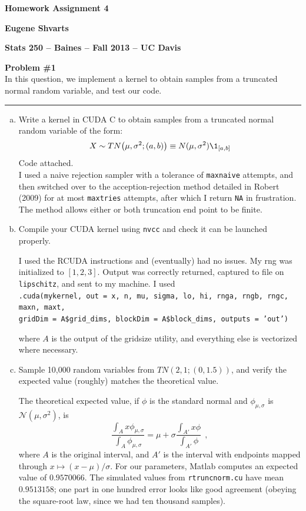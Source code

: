 \documentclass[12pt,letterpaper]{article}
\begin{document}
\hfill\textbf{\large Homework Assignment 4}

\hfill\textbf{Eugene Shvarts}

\hfill\textbf{ Stats 250 -- Baines -- Fall 2013 -- UC Davis}
\bigskip

\textbf{Problem \#1} \\ In this question, we implement a kernel to obtain samples from a truncated normal random variable, and test our code. \hrule \smallskip
\begin{enumerate}[a.]
\item Write a kernel in CUDA C to obtain samples from a truncated normal random variable of the form:
$$
X \sim TN\bigl(\mu,\sigma^2; (a,b)\bigr) \equiv N(\mu,\sigma^2) \1_{[a,b]}
$$
\textsf{Code attached.} \\ I used a naive rejection sampler with a tolerance of \texttt{maxnaive} attempts, and then switched over to the acception-rejection method detailed in Robert (2009) for at most \texttt{maxtries} attempts, after which I return \texttt{NA} in frustration. The method allows either or both truncation end point to be finite.

\item Compile your CUDA kernel using \texttt{nvcc} and check it can be launched properly.

I used the RCUDA instructions and (eventually) had no issues. My rng was initialized to $[1,2,3]$. Output was correctly returned, captured to file on \texttt{lipschitz}, and sent to my machine. I used \\
\texttt{.cuda(mykernel, out = x, n, mu, sigma, lo, hi, rnga, rngb, rngc, maxn, maxt, \\ gridDim = A\$grid\_dims, blockDim = A\$block\_dims, outputs = 'out')}

where $A$ is the output of the gridsize utility, and everything else is vectorized where necessary.

\item Sample 10,000 random variables from $TN(2,1;(0,1.5))$, and verify the expected value (roughly) matches the theoretical value.

The theoretical expected value, if $\phi$ is the standard normal and $\phi_{\mu,\sigma}$ is $\mathcal N (\mu,\sigma^2)$, is
$$
\frac{\int_A x\phi_{\mu,\sigma}}{\int_A \phi_{\mu,\sigma}} = \mu + \sigma \frac{\int_{A'} x\phi}{\int_{A'} \phi}~~,
$$
where $A$ is the original interval, and $A'$ is the interval with endpoints mapped through $x \mapsto (x-\mu)/\sigma$. For our parameters, Matlab computes an expected value of $0.9570066$. The simulated values from \texttt{rtruncnorm.cu} have mean $0.9513158$; one part in one hundred error looks like good agreement (obeying the square-root law, since we had ten thousand samples).


\end{enumerate}
\end{document}

